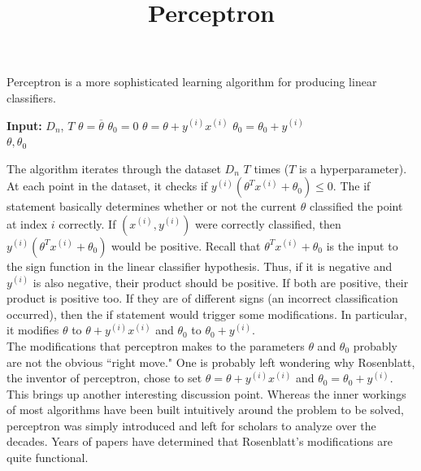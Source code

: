 \documentclass{article}
\title{Perceptron}
\author{ }
\date{ }
\begin{document}
	
	\maketitle 

    Perceptron is a more sophisticated learning algorithm for producing linear classifiers. 
    
    \begin{algorithm}
    \begin{algorithmic}[]
        \State \textbf{Input:} $D_n$, $T$
        \State $\theta = \overline{\theta}$
        \State $\theta_0 = 0$
                    \State $\theta = \theta + y^{(i)}x^{(i)}$
                    \State $\theta_0 = \theta_0+y^{(i)}$
                \EndIf
            \EndFor    
        \EndFor \\
        \Return $\theta, \theta_0$
    \end{algorithmic}
    \end{algorithm}

    The algorithm iterates through the dataset $D_n$ $T$ times ($T$ is a hyperparameter). At each point in the dataset, it checks if $y^{(i)}(\theta^Tx^{(i)}+\theta_0)\leq0$. The if statement basically determines whether or not the current $\theta$ classified the point at index $i$ correctly. If $(x^{(i)}, y^{(i)})$ were correctly classified, then $y^{(i)}(\theta^Tx^{(i)}+\theta_0)$ would be positive. Recall that $\theta^Tx^{(i)}+\theta_0$ is the input to the sign function in the linear classifier hypothesis. Thus, if it is negative and $y^{(i)}$ is also negative, their product should be positive. If both are positive, their product is positive too. If they are of different signs (an incorrect classification occurred), then the if statement would trigger some modifications. In particular, it modifies $\theta$ to $\theta+y^{(i)}x^{(i)}$ and $\theta_0$ to $\theta_0+y^{(i)}$. \\

    The modifications that perceptron makes to the parameters $\theta$ and $\theta_0$ probably are not the obvious ``right move." One is probably left wondering why Rosenblatt, the inventor of perceptron, chose to set $\theta=\theta+y^{(i)}x^{(i)}$ and $\theta_0=\theta_0+y^{(i)}$. This brings up another interesting discussion point. Whereas the inner workings of most algorithms have been built intuitively around the problem to be solved, perceptron was simply introduced and left for scholars to analyze over the decades. Years of papers have determined that Rosenblatt's modifications are quite functional. \\
\end{document}
